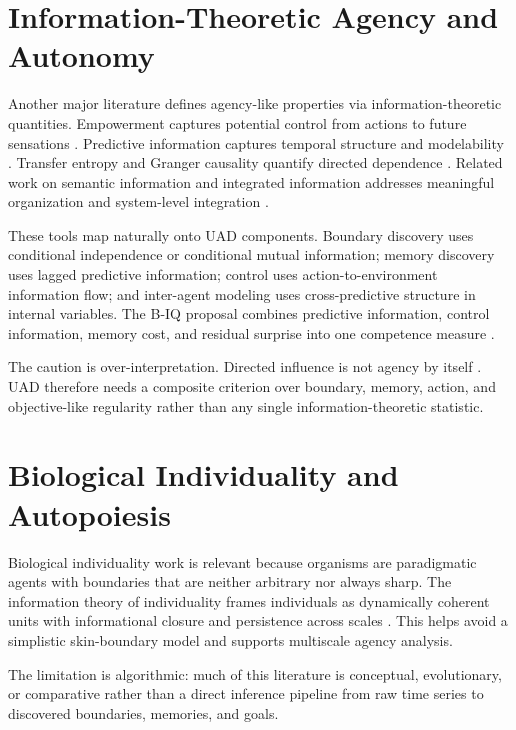\documentclass[11pt]{article}
\begin{document}
\section{Information-Theoretic Agency and Autonomy}

Another major literature defines agency-like properties via information-theoretic quantities. Empowerment captures potential control from actions to future sensations \cite{klyubin2005empowerment}. Predictive information captures temporal structure and modelability \cite{bialek2001predictability}. Transfer entropy and Granger causality quantify directed dependence \cite{schreiber2000te,barnett2009gc}. Related work on semantic information and integrated information addresses meaningful organization and system-level integration \cite{kolchinsky2018semantic,albantakis2023iit4}.

These tools map naturally onto UAD components. Boundary discovery uses conditional independence or conditional mutual information; memory discovery uses lagged predictive information; control uses action-to-environment information flow; and inter-agent modeling uses cross-predictive structure in internal variables. The B-IQ proposal combines predictive information, control information, memory cost, and residual surprise into one competence measure \cite{zarncke2025biq}.

The caution is over-interpretation. Directed influence is not agency by itself \cite{lizier2010transfer}. UAD therefore needs a composite criterion over boundary, memory, action, and objective-like regularity rather than any single information-theoretic statistic.

\section{Biological Individuality and Autopoiesis}

Biological individuality work is relevant because organisms are paradigmatic agents with boundaries that are neither arbitrary nor always sharp. The information theory of individuality frames individuals as dynamically coherent units with informational closure and persistence across scales \cite{krakauer2020individuality}. This helps avoid a simplistic skin-boundary model and supports multiscale agency analysis.

The limitation is algorithmic: much of this literature is conceptual, evolutionary, or comparative rather than a direct inference pipeline from raw time series to discovered boundaries, memories, and goals.
\end{document}
